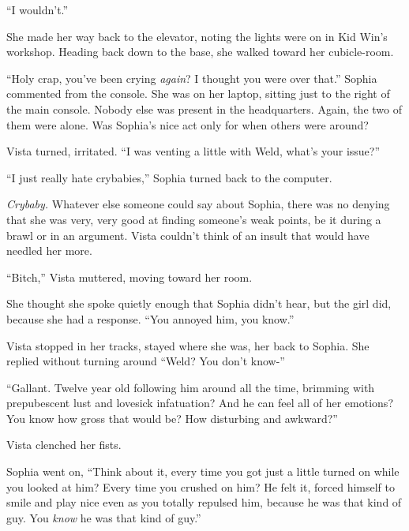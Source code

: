 ``I wouldn't.''



She made her way back to the elevator, noting the lights were on in Kid Win's workshop.  Heading back down to the base, she walked toward her cubicle-room.



``Holy crap, you've been crying \emph{again}?  I thought you were over that.''  Sophia commented from the console.  She was on her laptop, sitting just to the right of the main console.  Nobody else was present in the headquarters.  Again, the two of them were alone.  Was Sophia's nice act only for when others were around?



Vista turned, irritated.  ``I was venting a little with Weld, what's your issue?''



``I just really hate crybabies,'' Sophia turned back to the computer.



\emph{Crybaby.}  Whatever else someone could say about Sophia, there was no denying that she was very, very good at finding someone's weak points, be it during a brawl or in an argument.  Vista couldn't think of an insult that would have needled her more.



``Bitch,'' Vista muttered, moving toward her room.



She thought she spoke quietly enough that Sophia didn't hear, but the girl did, because she had a response.  ``You annoyed him, you know.''



Vista stopped in her tracks, stayed where she was, her back to Sophia.  She replied without turning around ``Weld?  You don't know-''



``Gallant.  Twelve year old following him around all the time, brimming with prepubescent lust and lovesick infatuation?  And he can feel all of her emotions?  You know how gross that would be?  How disturbing and awkward?''



Vista clenched her fists.



Sophia went on, ``Think about it, every time you got just a little turned on while you looked at him?  Every time you crushed on him?  He felt it, forced himself to smile and play nice even as you totally repulsed him, because he was that kind of guy.  You \emph{know} he was that kind of guy.''



